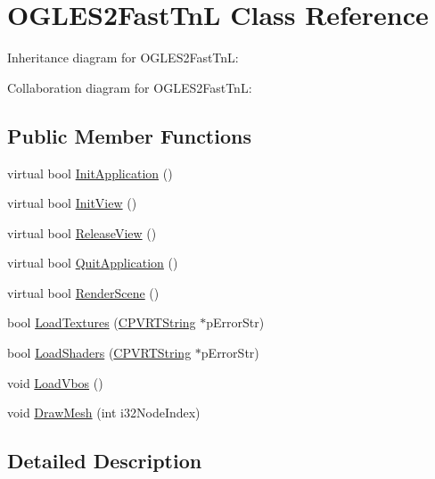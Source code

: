 \hypertarget{class_o_g_l_e_s2_fast_tn_l}{\section{O\+G\+L\+E\+S2\+Fast\+Tn\+L Class Reference}
\label{class_o_g_l_e_s2_fast_tn_l}
}


Inheritance diagram for O\+G\+L\+E\+S2\+Fast\+Tn\+L\+:


Collaboration diagram for O\+G\+L\+E\+S2\+Fast\+Tn\+L\+:
\subsection*{Public Member Functions}
\begin{DoxyCompactItemize}
\item 
virtual bool \hyperlink{class_o_g_l_e_s2_fast_tn_l_a27f9d3a21a5efc85f2d47c49068ad3b7}{Init\+Application} ()
\item 
virtual bool \hyperlink{class_o_g_l_e_s2_fast_tn_l_af6d1119313e9e80a6ff186452cf260d3}{Init\+View} ()
\item 
virtual bool \hyperlink{class_o_g_l_e_s2_fast_tn_l_a64744400ee4204a4e2b2ecd3839a217b}{Release\+View} ()
\item 
virtual bool \hyperlink{class_o_g_l_e_s2_fast_tn_l_a7ca6b510c8e18cd115108f8fe64e9b9f}{Quit\+Application} ()
\item 
virtual bool \hyperlink{class_o_g_l_e_s2_fast_tn_l_a07c563788f93b6f1246dedc7cf5853de}{Render\+Scene} ()
\item 
bool \hyperlink{class_o_g_l_e_s2_fast_tn_l_a6be4ecc23b8ca1c064a0cd3a4e29991a}{Load\+Textures} (\hyperlink{class_c_p_v_r_t_string}{C\+P\+V\+R\+T\+String} $\ast$p\+Error\+Str)
\item 
bool \hyperlink{class_o_g_l_e_s2_fast_tn_l_a51aa5cd22459c879592a012ba9030de3}{Load\+Shaders} (\hyperlink{class_c_p_v_r_t_string}{C\+P\+V\+R\+T\+String} $\ast$p\+Error\+Str)
\item 
void \hyperlink{class_o_g_l_e_s2_fast_tn_l_a2375df76d1b6ccea0abdc943d438b1b0}{Load\+Vbos} ()
\item 
void \hyperlink{class_o_g_l_e_s2_fast_tn_l_ab02678ec463adc23cc1711a090e0daf3}{Draw\+Mesh} (int i32\+Node\+Index)
\end{DoxyCompactItemize}


\subsection{Detailed Description}


